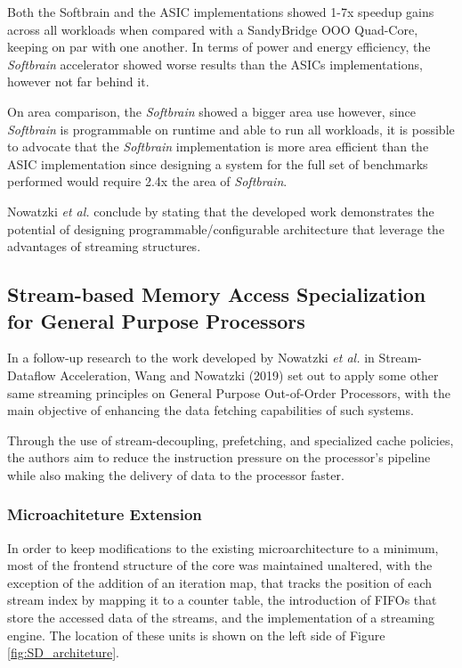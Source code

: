Both the Softbrain and the ASIC implementations showed 1-7x speedup gains across all workloads when compared with a SandyBridge OOO Quad-Core, keeping on par with one another. In terms of power and energy efficiency, the \textit{Softbrain} accelerator showed worse results than the ASICs implementations, however not far behind it. 

On area comparison, the \textit{Softbrain} showed a bigger area use however, since \textit{Softbrain} is programmable on runtime and able to run all workloads, it is possible to advocate that the \textit{Softbrain} implementation is more area efficient than the ASIC implementation since designing a system for the full set of benchmarks performed would require 2.4x the area of \textit{Softbrain}.

Nowatzki \textit{et al.} \cite{8192490} conclude by stating that the developed work demonstrates the potential of designing programmable/configurable architecture that leverage the advantages of streaming structures.


\subsection{Stream-based Memory Access Specialization for General Purpose Processors}

In a follow-up research to the work developed by Nowatzki \textit{et al.} in Stream-Dataflow Acceleration\cite{8192490}, Wang and Nowatzki (2019) \cite{8980305} set out to apply some other same streaming principles on General Purpose Out-of-Order Processors, with the main objective of enhancing the data fetching capabilities of such systems.

Through the use of stream-decoupling, prefetching, and specialized cache policies, the authors aim to reduce the instruction pressure on the processor's pipeline while also making the delivery of data to the processor faster.

\subsubsection{Microachiteture Extension}
In order to keep modifications to the existing microarchitecture to a minimum, most of the frontend structure of the core was maintained unaltered, with the exception of the addition of an iteration map, that tracks the position of each stream index by mapping it to a counter table, the introduction of FIFOs that store the accessed data of the streams, and the implementation of a streaming engine. The location of these units is shown on the left side of Figure \ref{fig:SD_architeture}.

